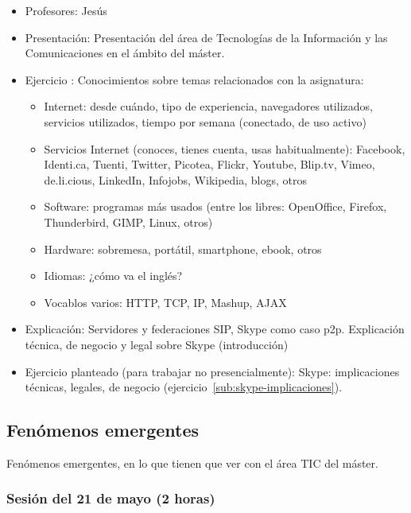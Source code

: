 \documentclass[a4paper,12pt]{article}
\begin{document}
\begin{itemize}
\item Profesores: Jesús
\item Presentación: Presentación del área de Tecnologías de la Información y las Comunicaciones en el ámbito del máster.
\item Ejercicio : Conocimientos sobre temas relacionados con la asignatura:
  \begin{itemize}
  \item Internet: desde cuándo, tipo de experiencia, navegadores utilizados, servicios utilizados, tiempo por semana (conectado, de uso activo)
  \item Servicios Internet (conoces, tienes cuenta, usas habitualmente): Facebook, Identi.ca, Tuenti, Twitter, Picotea, Flickr, Youtube, Blip.tv, Vimeo, de.li.cious, LinkedIn, Infojobs, Wikipedia, blogs, otros
  \item Software: programas más usados (entre los libres: OpenOffice, Firefox, Thunderbird, GIMP, Linux, otros)
  \item Hardware: sobremesa, portátil, smartphone, ebook, otros
  \item Idiomas: ¿cómo va el inglés?
  \item Vocablos varios: HTTP, TCP, IP, Mashup, AJAX
  \end{itemize}
\item Explicación: Servidores y federaciones SIP, Skype como caso p2p. Explicación técnica, de negocio y legal sobre Skype (introducción)
\item Ejercicio planteado (para trabajar no presencialmente): Skype: implicaciones técnicas, legales, de negocio (ejercicio~\ref{sub:skype-implicaciones}).
\end{itemize}

\subsection{Fenómenos emergentes}

Fenómenos emergentes, en lo que tienen que ver con el área TIC del máster.

\subsubsection{Sesión del 21 de mayo (2 horas)}
\end{document}
